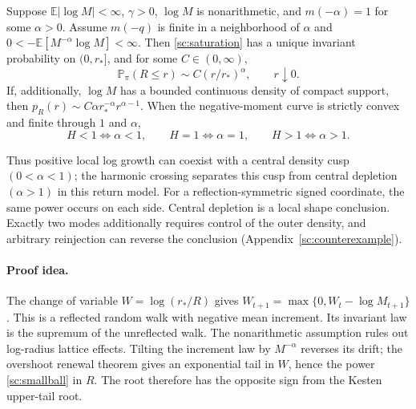 \begin{theorem}\label{sc:central-law}
Suppose \(\mathbb E|\log M|<\infty\), \(\gamma>0\),
\(\log M\) is nonarithmetic, and
\(m(-\alpha)=1\) for some \(\alpha>0\). Assume \(m(-q)\) is finite in a
neighborhood of \(\alpha\) and
\(0<-\mathbb E[M^{-\alpha}\log M]<\infty\).
Then \eqref{sc:saturation} has a unique invariant probability on
\((0,r_*]\), and for some \(C\in(0,\infty)\),
\begin{equation}
 \mathbb P_\pi(R\le r)\sim C(r/r_*)^\alpha,\qquad r\downarrow0.
 \label{sc:smallball}
\end{equation}
If, additionally, \(\log M\) has a bounded continuous density of compact
support, then
\(p_R(r)\sim C\alpha r_*^{-\alpha}r^{\alpha-1}\).
When the negative-moment curve is strictly convex and finite through
\(1\) and \(\alpha\),
\begin{equation}
 H<1\Longleftrightarrow\alpha<1,\qquad
 H=1\Longleftrightarrow\alpha=1,\qquad
 H>1\Longleftrightarrow\alpha>1.
 \label{sc:shape-ladder}
\end{equation}
\end{theorem}

Thus positive local log growth can coexist with a central density cusp
\((0<\alpha<1)\); the harmonic crossing separates this cusp from central
depletion \((\alpha>1)\) in this return model. For a reflection-symmetric
signed coordinate, the same power occurs on each side. Central depletion
is a local shape conclusion. Exactly two modes additionally requires
control of the outer density, and arbitrary reinjection can reverse the
conclusion (Appendix~\ref{sc:counterexample}).

\paragraph{Proof idea.}
The change of variable \(W=\log(r_*/R)\) gives
\(W_{t+1}=\max\{0,W_t-\log M_{t+1}\}\).
This is a reflected random walk with negative mean increment.
Its invariant law is the supremum of the unreflected walk. The nonarithmetic assumption rules out log-radius lattice effects. Tilting the
increment law by \(M^{-\alpha}\) reverses its drift; the overshoot renewal
theorem gives an exponential tail in \(W\), hence the power
\eqref{sc:smallball} in \(R\). The root therefore has the opposite sign
from the Kesten upper-tail root.

